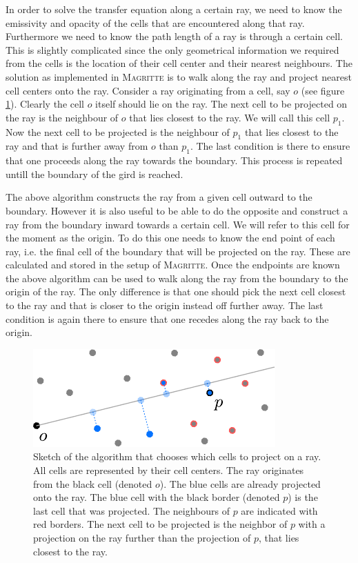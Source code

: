 \documentclass[a4paper,fleqn,usenatbib]{mnras}
\begin{document}
In order to solve the transfer equation along a certain ray, we need to know the emissivity and opacity of the cells that are encountered along that ray. Furthermore we need to know the path length of a ray is through a certain cell. This is slightly complicated since the only geometrical information we required from the cells is the location of their cell center and their nearest neighbours. The solution as implemented in \textsc{Magritte} is to walk along the ray and project nearest cell centers onto the ray. Consider a ray originating from a cell, say $o$ (see figure \ref{next_cell}). Clearly the cell $o$ itself should lie on the ray. The next cell to be projected on the ray is the neighbour of $o$ that lies closest to the ray. We will call this cell $p_{1}$. Now the next cell to be projected is the neighbour of $p_{1}$ that lies closest to the ray and that is further away from $o$ than $p_{1}$. The last condition is there to ensure that one proceeds along the ray towards the boundary. This process is repeated untill the boundary of the gird is reached.

The above algorithm constructs the ray from a given cell outward to the boundary. However it is also useful to be able to do the opposite and construct a ray from the boundary inward towards a certain cell. We will refer to this cell for the moment as the origin. To do this one needs to know the end point of each ray, i.e. the final cell of the boundary that will be projected on the ray. These are calculated and stored in the setup of \textsc{Magritte}. Once the endpoints are known the above algorithm can be used to walk along the ray from the boundary to the origin of the ray. The only difference is that one should pick the next cell closest to the ray and that is closer to the origin instead off further away. The last condition is again there to ensure that one recedes along the ray back to the origin.

\begin{figure}
	\centering
	\includegraphics[width=.9\columnwidth]{figures/next_cell.pdf}
  \caption{Sketch of the algorithm that chooses which cells to project on a ray. All cells are represented by their cell centers. The ray originates from the black cell (denoted $o$). The blue cells are already projected onto the ray. The blue cell with the black border (denoted $p$) is the last cell that was projected. The neighbours of $p$ are indicated with red borders. The next cell to be projected is the neighbor of $p$ with a projection on the ray further than the projection of $p$, that lies closest to the ray.}
  \label{next_cell}
\end{figure}
\end{document}
